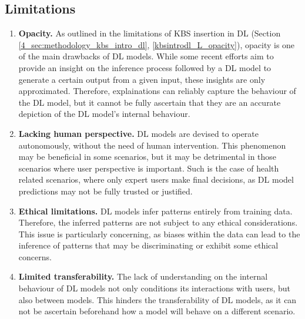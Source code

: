 \subsection{Limitations}
\begin{enumerate} [start=1,label={\bfseries L\arabic*.}]
    \item \textbf{Opacity.} \label{kbsextradl_L_opacity} As outlined in the limitations of KBS insertion in DL (Section \ref{4_sec:methodology_kbs_intro_dl}, \ref{kbsintrodl_L_opacity}), opacity is one of the main drawbacks of DL models. While some recent efforts aim to provide an insight on the inference process followed by a DL model to generate a certain output from a given input, these insights are only approximated. Therefore, explainations can reliably capture the behaviour of the DL model, but it cannot be fully ascertain that they are an accurate depiction of the DL model's internal behaviour.

    \item \textbf{Lacking human perspective.} \label{kbsextradl_L_human} DL models are devised to operate autonomously, without the need of human intervention. This phenomenon may be beneficial in some scenarios, but it may be detrimental in those scenarios where user perspective is important. Such is the case of health related scenarios, where only expert users make final decisions, as DL model predictions may not be fully trusted or justified. 
    
    \item \textbf{Ethical limitations.} \label{kbsextradl_L_ethical} DL models infer patterns entirely from training data. Therefore, the inferred patterns are not subject to any ethical considerations. This issue is particularly concerning, as biases within the data can lead to the inference of patterns that may be discriminating or exhibit some ethical concerns.
    
    \item \textbf{Limited transferability.}\label{kbsextradl_L_transferability} The lack of understanding on the internal behaviour of DL models not only conditions its interactions with users, but also between models. This hinders the transferability of DL models, as it can not be ascertain beforehand how a model will behave on a different scenario.
\end{enumerate}

